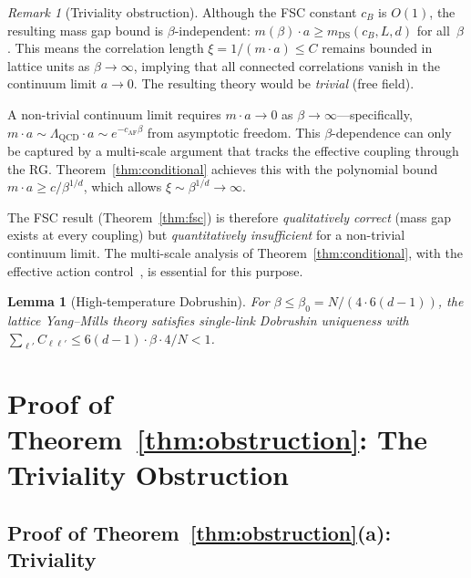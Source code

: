 \documentclass[11pt,a4paper]{article}
\theoremstyle{plain}
\newtheorem{lemma}[theorem]{Lemma}
\theoremstyle{definition}
\theoremstyle{remark}
\newtheorem{remark}[theorem]{Remark}
\begin{document}
\begin{remark}[Triviality obstruction]\label{rem:triviality}
Although the FSC constant $c_B$ is $O(1)$, the resulting
mass gap bound is $\beta$-independent:
$m(\beta) \cdot a \geq m_{\mathrm{DS}}(c_B, L, d)$
for all~$\beta$.  This means the correlation length
$\xi = 1/(m \cdot a) \leq C$ remains bounded in lattice
units as $\beta \to \infty$, implying that all connected
correlations vanish in the continuum limit $a \to 0$.
The resulting theory would be \emph{trivial} (free field).

A non-trivial continuum limit requires
$m \cdot a \to 0$ as $\beta \to \infty$---specifically,
$m \cdot a \sim \Lambda_{\mathrm{QCD}} \cdot a
\sim e^{-c_{\mathrm{AF}} \beta}$ from asymptotic freedom.
This $\beta$-dependence can only be captured by a
multi-scale argument that tracks the effective coupling
through the RG.  Theorem~\ref{thm:conditional} achieves
this with the polynomial bound $m \cdot a \geq c/\beta^{1/d}$,
which allows $\xi \sim \beta^{1/d} \to \infty$.

The FSC result (Theorem~\ref{thm:fsc}) is therefore
\emph{qualitatively correct} (mass gap exists at every
coupling) but \emph{quantitatively insufficient} for a non-trivial
continuum limit.  The multi-scale analysis of
Theorem~\ref{thm:conditional}, with the effective action
control~\cite{FontesSU2}, is essential for this purpose.
\end{remark}

\begin{lemma}[High-temperature Dobrushin]\label{lem:high_temp_dob}
For $\beta \leq \beta_0 = N/(4 \cdot 6(d{-}1))$, the lattice
Yang--Mills theory satisfies single-link Dobrushin uniqueness
with $\sum_{\ell'} C_{\ell\ell'} \leq 6(d{-}1) \cdot \beta
\cdot 4/N < 1$.
\end{lemma}


\section{Proof of Theorem~\ref{thm:obstruction}:
The Triviality Obstruction}\label{sec:obstruction}

\subsection{Proof of Theorem~\ref{thm:obstruction}(a): Triviality}
\end{document}
